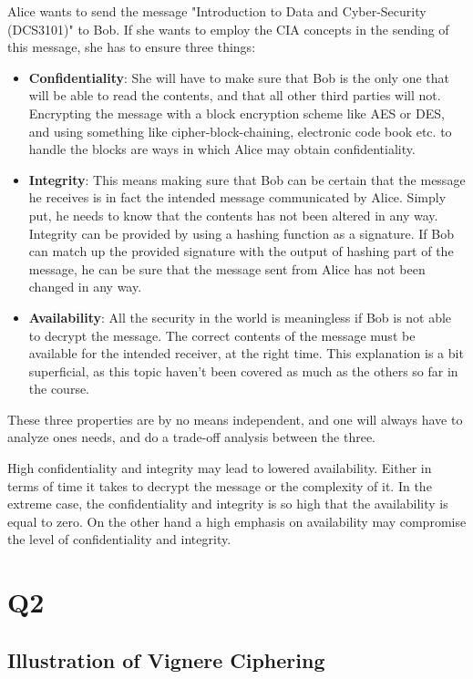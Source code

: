 \documentclass{article}
\begin{document}
Alice wants to send the message "Introduction to Data and Cyber-Security (DCS3101)" to Bob. If she wants to employ the CIA concepts in the sending of this message, she has to ensure three things:
\begin{itemize}
\item{\textbf{Confidentiality}: She will have to make sure that Bob is the only one that will be able to read the contents, and that all other third parties will not. Encrypting the message with a block encryption scheme like AES or DES, and using something like cipher-block-chaining, electronic code book etc. to handle the blocks are ways in which Alice may obtain confidentiality.}
\item{\textbf{Integrity}: This means making sure that Bob can be certain that the message he receives is in fact the intended message communicated by Alice. Simply put, he needs to know that the contents has not been altered in any way. Integrity can be provided by using a hashing function as a signature. If Bob can match up the provided signature with the output of hashing part of the message, he can be sure that the message sent from Alice has not been changed in any way.}
\item{\textbf{Availability}: All the security in the world is meaningless if Bob is not able to decrypt the message. The correct contents of the message must be available for the intended receiver, at the right time. This explanation is a bit superficial, as this topic haven't been covered as much as the others so far in the course. }
\end{itemize}

These three properties are by no means independent, and one will always have to analyze ones needs, and do a trade-off analysis between the three.

High confidentiality and integrity may lead to lowered availability. Either in terms of time it takes to decrypt the message or the complexity of it. In the extreme case, the confidentiality and integrity is so high that the availability is equal to zero. On the other hand a high emphasis on availability may compromise the level of confidentiality and integrity. 

\section{Q2}
\subsection{Illustration of Vignere Ciphering}
\end{document}
